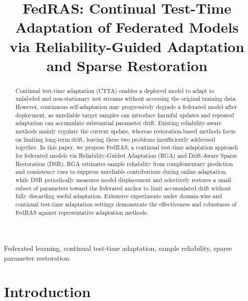 \documentclass[journal]{IEEEtran}
\begin{document}
\title{FedRAS: Continual Test-Time Adaptation of Federated Models via Reliability-Guided Adaptation and Sparse Restoration}

\author{
}

\maketitle

\begin{abstract}
Continual test-time adaptation (CTTA) enables a deployed model to adapt to unlabeled and non-stationary test streams without accessing the original training data. However, continuous self-adaptation may progressively degrade a federated model after deployment, as unreliable target samples can introduce harmful updates and repeated adaptation can accumulate substantial parameter drift. Existing reliability-aware methods mainly regulate the current update, whereas restoration-based methods focus on limiting long-term drift, leaving these two problems insufficiently addressed together. In this paper, we propose FedRAS, a continual test-time adaptation approach for federated models via Reliability-Guided Adaptation (RGA) and Drift-Aware Sparse Restoration (DSR). RGA estimates sample reliability from complementary prediction and consistency cues to suppress unreliable contributions during online adaptation, while DSR periodically measures model displacement and selectively restores a small subset of parameters toward the federated anchor to limit accumulated drift without fully discarding useful adaptation. Extensive experiments under domain-wise and continual test-time adaptation settings demonstrate the effectiveness and robustness of FedRAS against representative adaptation methods.
\end{abstract}

\begin{IEEEkeywords}
Federated learning, continual test-time adaptation, sample reliability, sparse parameter restoration.
\end{IEEEkeywords}

\section{Introduction}
\label{sec:introduction}
\end{document}
